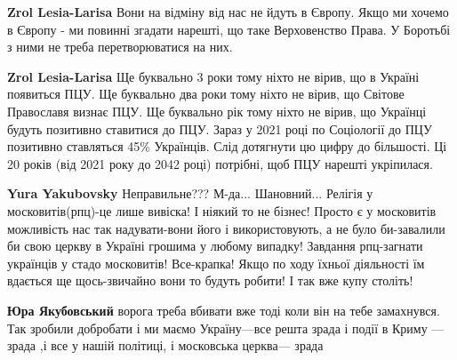 \begin{itemize}
\begin{itemize}
 
\textbf{Zrol Lesia-Larisa} Вони на відміну від нас не йдуть в Європу. Якщо ми
хочемо в Європу - ми повинні згадати нарешті, що таке Верховенство Права. У
Боротьбі з ними не треба перетворюватися на них.

 
\textbf{Zrol Lesia-Larisa} Ще буквально 3 роки тому ніхто не вірив, що в
Україні появиться ПЦУ. Ще буквально два роки тому ніхто не вірив, що Світове
Православя визнає ПЦУ. Ще буквально рік тому ніхто не вірив, що Українці будуть
позитивно ставитися до ПЦУ. Зараз у 2021 році по Соціології до ПЦУ позитивно
ставляться 45\% Українців. Слід дотягнути цю цифру до більшості. Ці 20 років
(від 2021 року до 2042 році) потрібні, щоб ПЦУ нарешті укріпилася.

 
\textbf{Yura Yakubovsky} Неправильне??? М-да... Шановний... Релігія у
московитів(рпц)-це лише вивіска! І ніякий то не бізнес! Просто є у московитів
можливість нас так надувати-вони його і використовують, а не було би-завалили би
свою церкву в Україні грошима у любому випадку! Завдання рпц-загнати українців у
стадо московитів! Все-крапка! Якщо по ходу їхньої діяльності їм вдається ще
щось-звичайно вони то будуть робити! І так вже купу століть!

 
\textbf{Юра Якубовський} ворога треба вбивати вже тоді коли він на тебе
замахнувся. Так зробили добробати і ми маємо Україну—все решта зрада і події в
Криму —зрада ,і все у нашій політиці, і московська церква— зрада


\end{itemize}
\end{itemize}
